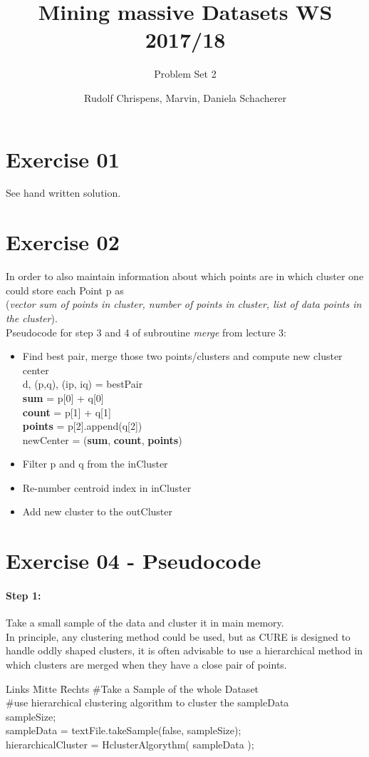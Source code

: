 \documentclass[11pt,a4paper]{scrartcl}
\title{Mining massive Datasets WS 2017/18}
\subtitle{Problem Set 2}
\author{Rudolf Chrispens, Marvin, Daniela Schacherer}
\begin{document}
\maketitle

	\section*{Exercise 01}
	See hand written solution. 
	\section*{Exercise 02}
	In order to also maintain information about which points are in which cluster one could store each Point p as \\
(\textit{vector sum of points in cluster, number of points in cluster, list of data points in the cluster}). \\

Pseudocode for step 3 and 4 of subroutine \textit{merge} from lecture 3:
	\begin{itemize}
		\item Find best pair, merge those two points/clusters and compute new cluster center\\
		d, (p,q), (ip, iq) = bestPair\\
		\textbf{sum} = p[0] + q[0] \\
		\textbf{count} = p[1] + q[1] \\
		\textbf{points} = p[2].append(q[2]) \\
		newCenter = (\textbf{sum}, \textbf{count}, \textbf{points}) \\

		\item Filter p and q from the inCluster
		\item Re-number centroid index in inCluster
		\item Add new cluster to the outCluster
		
	\end{itemize}

\section*{Exercise 04 - Pseudocode}
\paragraph{Step 1:}
Take a small sample of the data and cluster it in main memory.\\
In principle, any clustering method could be used, but as CURE is designed to handle oddly shaped clusters, it is often advisable to use a hierarchical method in which clusters are merged when they have a close pair of points.
\begin{tabbing}
Links \= Mitte \= Rechts \kill
\>	\#Take a Sample of the whole Dataset\\
\>	\#use hierarchical clustering algorithm to cluster the sampleData\\
\> \>	 sampleSize;\\
\> \> 	sampleData = textFile.takeSample(false, sampleSize);\\
\> \>	hierarchicalCluster = HclusterAlgorythm( sampleData );
\end{tabbing}
\end{document}
